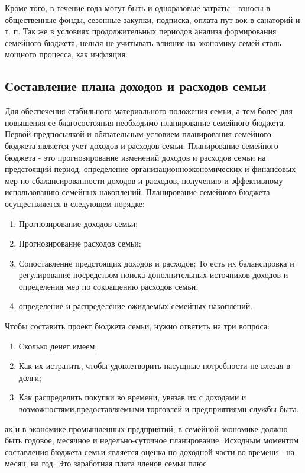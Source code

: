 Кроме того, в течение года могут быть и одноразовые затраты - взносы в
общественные фонды, сезонные закупки, подписка, оплата пут вок в санаторий и т. п.
Так же в условиях продолжительных периодов анализа формирования семейного бюджета, нельзя не учитывать влияние на экономику семей столь
мощного процесса, как инфляция.

\subsection{Составление плана доходов и расходов семьи}
Для обеспечения стабильного материального положения семьи, а тем более для повышения ее благосостояния необходимо планирование семейного
бюджета.
Первой предпосылкой и обязательным условием планирования семейного
бюджета является учет доходов и расходов семьи.
Планирование семейного бюджета - это прогнозирование изменений доходов и расходов семьи на предстоящий период, определение организационноэкономических и финансовых мер по сбалансированности доходов и расходов,
получению и эффективному использованию семейных накоплений.
Планирование семейного бюджета осуществляется в следующем порядке:
\begin{enumerate}
\item Прогнозирование доходов семьи;
\item Прогнозирование расходов семьи;
\item Сопоставление предстоящих доходов и расходов;
То есть их балансировка и регулирование посредством поиска дополнительных источников доходов и определения мер по сокращению расходов семьи.
\item определение и распределение ожидаемых семейных накоплений.
\end{enumerate}
\pagebreak
Чтобы составить проект бюджета семьи, нужно ответить на три вопроса:
\begin{enumerate}
\item Сколько денег имеем;
\item Как их истратить, чтобы удовлетворить насущные потребности не влезая в долги;
\item Как распределить покупки во времени, увязав их с доходами и возможностями,предоставляемыми торговлей и предприятиями службы быта.
\end{enumerate}
ак и в экономике промышленных предприятий, в семейной экономике
должно быть годовое, месячное и недельно-суточное планирование. Исходным моментом составления бюджета семьи является оценка по доходной части во времени - на месяц, на год. Это заработная плата членов семьи плюс

